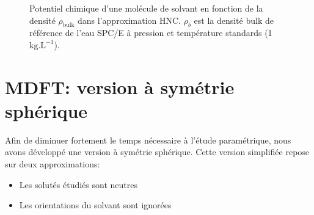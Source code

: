 


\begin{figure}[h]
    \center
    \caption[Potentiel chimique d'une molécule de solvant en fonction de sa densité.]{Potentiel chimique d'une molécule de solvant en fonction de la densité $\rho_{\mathrm{bulk}}$ dans l'approximation HNC. $\rho_b$ est la densité bulk de référence de l'eau SPC/E à pression et température standards (1 $\mathrm{kg.L}^{-1}$).}
    \label{fig:fonctionelle_HNC}
\end{figure}





\section{MDFT: version à symétrie sphérique}
Afin de diminuer fortement le temps nécessaire à l'étude paramétrique, nous avons développé une version à symétrie sphérique. Cette version simplifiée repose sur deux approximations:
\begin{itemize}
\item Les solutés étudiés sont neutres
\item Les orientations du solvant sont ignorées
\end{itemize}

